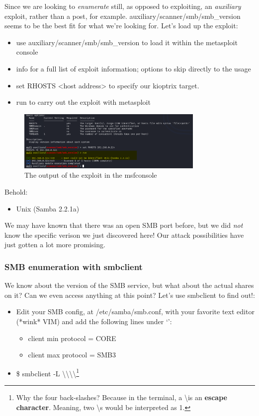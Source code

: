 \documentclass[a4paper,11pt]{article}
\renewcommand{\tt}[2][tt]{\textcolor{#1}{\ttfamily #2}}%
\begin{document}
Since we are looking to \textit{enumerate} still, as opposed to exploiting, an \textit{auxiliary} exploit, rather than a \tt{post}, for example. \tt{auxiliary/scanner/smb/smb\_version} seems to be the best fit for what we're looking for. Let's load up the exploit:
\begin{itemize}
    \item \tt{use auxiliary/scanner/smb/smb\_version} to load it within the metasploit console
    \item \tt{info} for a full list of exploit information; \tt{options} to skip directly to the usage
    \item \tt{set RHOSTS <host address>} to specify our kioptrix target.
    \item \tt{run} to carry out the exploit with metasploit
\end{itemize}
\pagebreak

\begin{figure}[ht]
    \centering
    \includegraphics[width=0.8\textwidth]{images/usesmbversion.png}
    \caption{The output of the exploit in the msfconsole}
    \label{fig:usesmbversion}
\end{figure}
Behold:
\begin{itemize}
    \item \tt{Unix (Samba 2.2.1a)}
\end{itemize}
We may have known that there was an open SMB port before, but we did \textit{not} know the specific verison we just discovered here! Our attack possibilities have just gotten a lot more promising.

\subsubsection{SMB enumeration with smbclient}

We know about the version of the SMB service, but what about the actual shares on it? Can we even access anything at this point? Let's use \tt{smbclient} to find out!:
\begin{itemize}
    \item Edit your SMB config, at \tt{/etc/samba/smb.conf}, with your favorite text editor (*wink* VIM) and add the following lines under `\tt{[global]}':
    \begin{itemize}
        \item \tt{client min protocol = CORE}
        \item \tt{client max protocol = SMB3}
    \end{itemize}
    \item \tt{\$ smbclient -L \textbackslash \textbackslash \textbackslash \textbackslash<target IP>}\footnote[2]{Why the four back-slashes? Because in the terminal, a \textbackslash is an {\bfseries escape character}. Meaning, two \textbackslash s would be interpreted as 1.}
\end{itemize}
\end{document}
